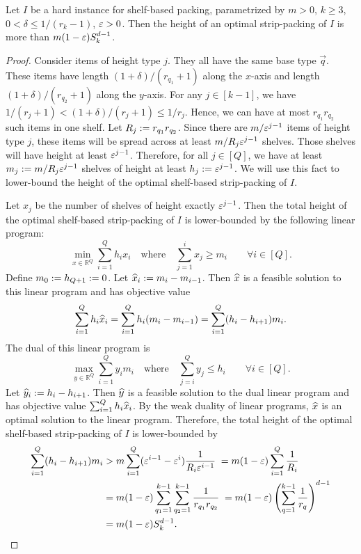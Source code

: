 \begin{theorem}
Let $I$ be a hard instance for shelf-based packing, parametrized by
$m > 0$, $k \ge 3$, $0 < \delta \le 1/(r_k-1)$, $\varepsilon > 0$.
Then the height of an optimal strip-packing of $I$ is more than $m(1-\varepsilon)S_k^{d-1}$.
\end{theorem}
\begin{proof}
Consider items of height type $j$. They all have the same base type $\vec{q}$.
These items have length $(1+\delta)/(r_{q_1}+1)$ along the $x$-axis
and length $(1+\delta)/(r_{q_2}+1)$ along the $y$-axis.
For any $j \in [k-1]$, we have $1/(r_j+1) < (1+\delta)/(r_j+1) \le 1/r_j$.
Hence, we can have at most $r_{q_1} r_{q_2}$ such items in one shelf.
Let $R_j := r_{q_1} r_{q_2}$.
Since there are $m/\varepsilon^{j-1}$ items of height type $j$,
these items will be spread across at least $m/R_j\varepsilon^{j-1}$ shelves.
Those shelves will have height at least $\varepsilon^{j-1}$. Therefore, for all $j \in [Q]$,
we have at least $m_j := m/R_j\varepsilon^{j-1}$ shelves of height at least $h_j := \varepsilon^{j-1}$.
We will use this fact to lower-bound the height of the optimal shelf-based strip-packing of $I$.

Let $x_j$ be the number of shelves of height exactly $\varepsilon^{j-1}$.
Then the total height of the optimal shelf-based strip-packing of $I$ is
lower-bounded by the following linear program:
\[ \min_{x \in \mathbb{R}^Q} \sum_{i=1}^Q h_ix_i
\quad \textrm{where} \quad \sum_{j=1}^i x_j \ge m_i \qquad \forall i \in [Q]. \]
Define $m_0 := h_{Q+1} := 0$. Let $\widehat{x}_i := m_i - m_{i-1}$.
Then $\widehat{x}$ is a feasible solution to this linear program and has objective value
\[ \sum_{i=1}^Q h_i\widehat{x}_i
= \sum_{i=1}^Q h_i(m_i - m_{i-1})
= \sum_{i=1}^Q (h_i - h_{i+1})m_i. \]
The dual of this linear program is
\[ \max_{y \in \mathbb{R}^Q} \sum_{i=1}^Q y_im_i
\quad \textrm{where} \quad \sum_{j=i}^Q y_j \le h_i \qquad \forall i \in [Q]. \]
Let $\widehat{y}_i := h_i - h_{i+1}$.
Then $\widehat{y}$ is a feasible solution to the dual linear program
and has objective value $\sum_{i=1}^Q h_i\widehat{x}_i$.
By the weak duality of linear programs, $\widehat{x}$ is an optimal solution to the linear program.
Therefore, the total height of the optimal shelf-based strip-packing of $I$ is
lower-bounded by
\begin{align*}
\sum_{i=1}^Q (h_i - h_{i+1})m_i
&> m \sum_{i=1}^Q (\varepsilon^{i-1} - \varepsilon^i) \frac{1}{R_i\varepsilon^{i-1}}
\; = m(1-\varepsilon) \sum_{i=1}^Q \frac{1}{R_i}
\\ &= m(1-\varepsilon) \sum_{q_1=1}^{k-1} \sum_{q_2=1}^{k-1} \frac{1}{r_{q_1}r_{q_2}}
\; = m(1-\varepsilon) \left(\sum_{q=1}^{k-1} \frac{1}{r_q}\right)^{d-1}
\\ &= m(1-\varepsilon) S_k^{d-1}.
\qedhere \end{align*}
\end{proof}
